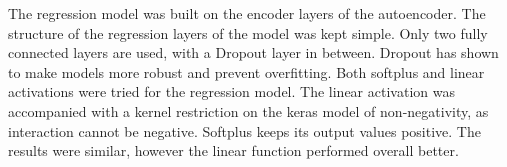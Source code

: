 The regression model was built on the encoder layers of the autoencoder. The structure of the regression layers of the model was kept simple. Only two fully connected layers are used, with a Dropout layer in between. Dropout has shown to make models more robust and prevent overfitting.
Both softplus and linear activations were tried for the regression model. The linear activation was accompanied with a kernel restriction on the keras model of non-negativity, as interaction cannot be negative. Softplus keeps its output values positive. The results were similar, however the linear function performed overall better.
